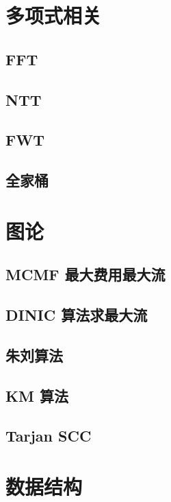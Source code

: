 \documentclass[a4paper,12pt]{article}
\begin{document}
\section{多项式相关}

\subsection{FFT}

\subsection{NTT}

\subsection{FWT}

\subsection{全家桶}


\section{图论}

\subsection{MCMF 最大费用最大流}

\subsection{DINIC 算法求最大流}

\subsection{朱刘算法}

\subsection{KM 算法}

\subsection{Tarjan SCC}


\section{数据结构}
\end{document}
